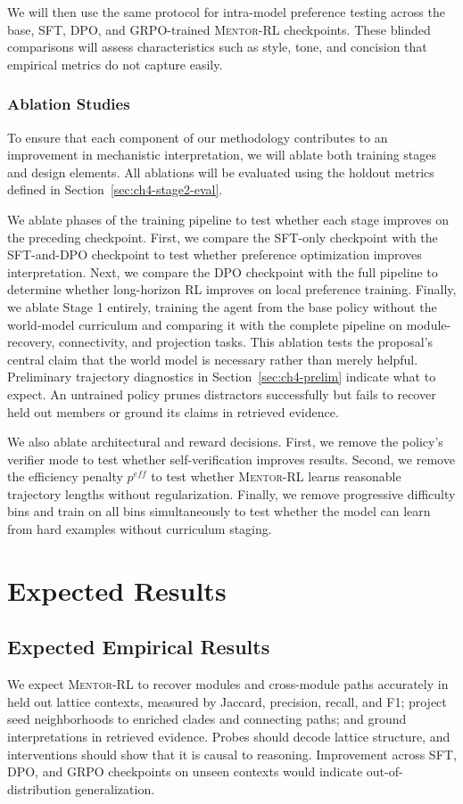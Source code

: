 We will then use the same protocol for intra-model preference testing across the base, SFT, DPO, and GRPO-trained \textsc{Mentor-RL} checkpoints. These blinded comparisons will assess characteristics such as style, tone, and concision that empirical metrics do not capture easily.

\subsubsection{Ablation Studies}
To ensure that each component of our methodology contributes to an improvement in mechanistic interpretation, we will ablate both training stages and design elements. All ablations will be evaluated using the holdout metrics defined in Section~\ref{sec:ch4-stage2-eval}.

We ablate phases of the training pipeline to test whether each stage improves on the preceding checkpoint. First, we compare the SFT-only checkpoint with the SFT-and-DPO checkpoint to test whether preference optimization improves interpretation. Next, we compare the DPO checkpoint with the full pipeline to determine whether long-horizon RL improves on local preference training. Finally, we ablate Stage 1 entirely, training the agent from the base policy without the world-model curriculum and comparing it with the complete pipeline on module-recovery, connectivity, and projection tasks. This ablation tests the proposal's central claim that the world model is necessary rather than merely helpful. Preliminary trajectory diagnostics in Section~\ref{sec:ch4-prelim} indicate what to expect. An untrained policy prunes distractors successfully but fails to recover held out members or ground its claims in retrieved evidence.

We also ablate architectural and reward decisions. First, we remove the policy's verifier mode to test whether self-verification improves results. Second, we remove the efficiency penalty $p^{eff}$ to test whether \textsc{Mentor-RL} learns reasonable trajectory lengths without regularization. Finally, we remove progressive difficulty bins and train on all bins simultaneously to test whether the model can learn from hard examples without curriculum staging.

\section{Expected Results}
\subsection{Expected Empirical Results}
We expect \textsc{Mentor-RL} to recover modules and cross-module paths accurately in held out lattice contexts, measured by Jaccard, precision, recall, and F1; project seed neighborhoods to enriched clades and connecting paths; and ground interpretations in retrieved evidence. Probes should decode lattice structure, and interventions should show that it is causal to reasoning. Improvement across SFT, DPO, and GRPO checkpoints on unseen contexts would indicate out-of-distribution generalization.

